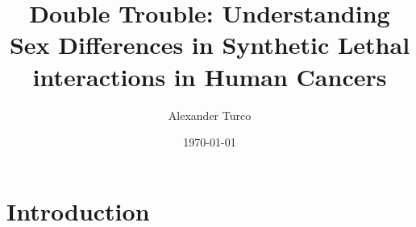 \documentclass{beamer}
\title[BEAP Dec 2022]{Double Trouble: Understanding Sex Differences in Synthetic Lethal interactions in Human Cancers}
\author{Alexander Turco}
\date{\today}
\begin{document}
	
	\section{Introduction}
	\begin{frame}
		\titlepage 
		\begin{center}
		\end{center}
	\end{frame}
	
	\logo{}
	
		
				

	
	
\end{document}
